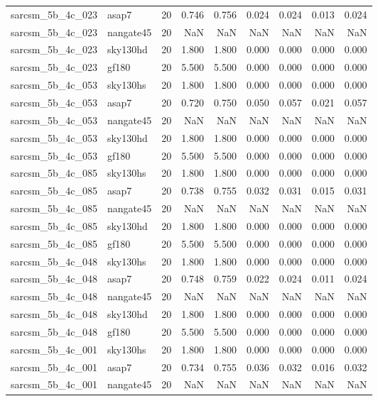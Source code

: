 \begin{tabular}{llrrrrrrr}
sarcsm\_5b\_4c\_023 & asap7 & 20 & 0.746 & 0.756 & 0.024 & 0.024 & 0.013 & 0.024 \\
sarcsm\_5b\_4c\_023 & nangate45 & 20 & NaN & NaN & NaN & NaN & NaN & NaN \\
sarcsm\_5b\_4c\_023 & sky130hd & 20 & 1.800 & 1.800 & 0.000 & 0.000 & 0.000 & 0.000 \\
sarcsm\_5b\_4c\_023 & gf180 & 20 & 5.500 & 5.500 & 0.000 & 0.000 & 0.000 & 0.000 \\
sarcsm\_5b\_4c\_053 & sky130hs & 20 & 1.800 & 1.800 & 0.000 & 0.000 & 0.000 & 0.000 \\
sarcsm\_5b\_4c\_053 & asap7 & 20 & 0.720 & 0.750 & 0.050 & 0.057 & 0.021 & 0.057 \\
sarcsm\_5b\_4c\_053 & nangate45 & 20 & NaN & NaN & NaN & NaN & NaN & NaN \\
sarcsm\_5b\_4c\_053 & sky130hd & 20 & 1.800 & 1.800 & 0.000 & 0.000 & 0.000 & 0.000 \\
sarcsm\_5b\_4c\_053 & gf180 & 20 & 5.500 & 5.500 & 0.000 & 0.000 & 0.000 & 0.000 \\
sarcsm\_5b\_4c\_085 & sky130hs & 20 & 1.800 & 1.800 & 0.000 & 0.000 & 0.000 & 0.000 \\
sarcsm\_5b\_4c\_085 & asap7 & 20 & 0.738 & 0.755 & 0.032 & 0.031 & 0.015 & 0.031 \\
sarcsm\_5b\_4c\_085 & nangate45 & 20 & NaN & NaN & NaN & NaN & NaN & NaN \\
sarcsm\_5b\_4c\_085 & sky130hd & 20 & 1.800 & 1.800 & 0.000 & 0.000 & 0.000 & 0.000 \\
sarcsm\_5b\_4c\_085 & gf180 & 20 & 5.500 & 5.500 & 0.000 & 0.000 & 0.000 & 0.000 \\
sarcsm\_5b\_4c\_048 & sky130hs & 20 & 1.800 & 1.800 & 0.000 & 0.000 & 0.000 & 0.000 \\
sarcsm\_5b\_4c\_048 & asap7 & 20 & 0.748 & 0.759 & 0.022 & 0.024 & 0.011 & 0.024 \\
sarcsm\_5b\_4c\_048 & nangate45 & 20 & NaN & NaN & NaN & NaN & NaN & NaN \\
sarcsm\_5b\_4c\_048 & sky130hd & 20 & 1.800 & 1.800 & 0.000 & 0.000 & 0.000 & 0.000 \\
sarcsm\_5b\_4c\_048 & gf180 & 20 & 5.500 & 5.500 & 0.000 & 0.000 & 0.000 & 0.000 \\
sarcsm\_5b\_4c\_001 & sky130hs & 20 & 1.800 & 1.800 & 0.000 & 0.000 & 0.000 & 0.000 \\
sarcsm\_5b\_4c\_001 & asap7 & 20 & 0.734 & 0.755 & 0.036 & 0.032 & 0.016 & 0.032 \\
sarcsm\_5b\_4c\_001 & nangate45 & 20 & NaN & NaN & NaN & NaN & NaN & NaN \\

\end{tabular}
